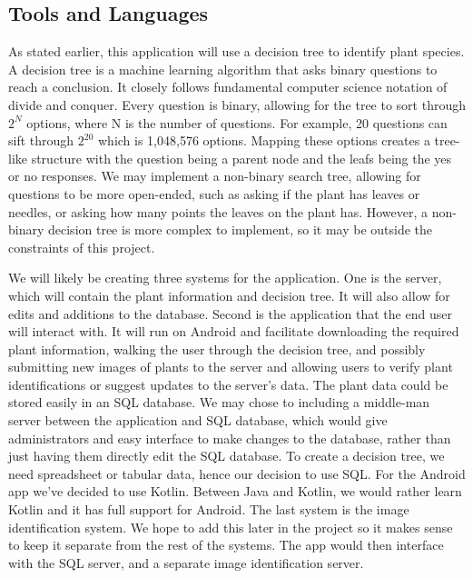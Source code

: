 \documentclass[a4paper]{article}
\begin{document}
\subsection{Tools and Languages}
As stated earlier, this application will use a decision tree to identify plant species. A decision tree is a machine learning algorithm that asks binary questions to reach a conclusion. It closely follows fundamental computer science notation of divide and conquer. Every question is binary, allowing for the tree to sort through $2^N$ options, where N is the number of questions. For example, 20 questions can sift through $2^{20}$ which is 1,048,576 options. Mapping these options creates a tree-like structure with the question being a parent node and the leafs being the yes or no responses. We may implement a non-binary search tree, allowing for questions to be more open-ended, such as asking if the plant has leaves or needles, or asking how many points the leaves on the plant has. However, a non-binary decision tree is more complex to implement, so it may be outside the constraints of this project.

We will likely be creating three systems for the application. One is the server, which will contain the plant information and decision tree. It will also allow for edits and additions to the database. Second is the application that the end user will interact with.  It will run on Android and facilitate downloading the required plant information, walking the user through the decision tree, and possibly submitting new images of plants to the server and allowing users to verify plant identifications or suggest updates to the server's data. The plant data could be stored easily in an SQL database.  We may chose to including a middle-man server between the application and SQL database, which would give administrators and easy interface to make changes to the database, rather than just having them directly edit the SQL database. To create a decision tree, we need spreadsheet or tabular data, hence our decision to use SQL.  For the Android app we've decided to use Kotlin.  Between Java and Kotlin, we would rather learn Kotlin and it has full support for Android.  The last system is the image identification system.  We hope to add this later in the project so it makes sense to keep it separate from the rest of the systems.  The app would then interface with the SQL server, and a separate image identification server.
\end{document}
